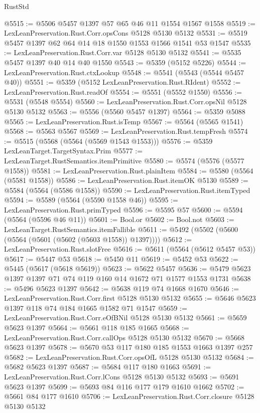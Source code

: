 \begin{lexlean}{RustStd}
\begin{coremodule}
{\begin{coremodule}
{{{{{{{{{{{{{{{{{{{{{{{{{{{{{{{{@5515 := @5506 @5457 @1397 @57 @65 @46 @11 @1554 @1567 @1558
@5519 := LexLeanPreservation.Rust.Corr.opsCons @5128 @5130 @5132
@5531 := @5519 @5457 @1397 @62 @64 @14 @18 @1550 @1553 @1566 @1541 @53 @1547
@5535 := LexLeanPreservation.Rust.Corr.var @5128 @5130 @5132
@5541 := @5535 @5457 @1397 @40 @14 @40 @1550
@5543 := @5359 (@5152 @5226)
@5544 := LexLeanPreservation.Rust.ctxLookup
@5548 := @5541 (@5543 (@5544 @5457 @40))
@5551 := @5359 (@5152 LexLeanPreservation.Rust.RIdent)
@5552 := LexLeanPreservation.Rust.readOf
@5554 := @5551 (@5552 @1550)
@5556 := @5531 (@5548 @5554)
@5560 := LexLeanPreservation.Rust.Corr.opsNil @5128 @5130 @5132
@5563 := @5556 (@5560 @5457 @1397)
@5564 := @5359 @5088
@5565 := LexLeanPreservation.Rust.isTemp
@5567 := @5564 (@5565 @1541)
@5568 := @5563 @5567
@5569 := LexLeanPreservation.Rust.tempFresh
@5574 := @5515 (@5568 (@5564 (@5569 @1543 @1553)))
@5576 := @5359 LexLeanTarget.TargetSyntax.Prim
@5577 := LexLeanTarget.RustSemantics.itemPrimitive
@5580 := @5574 (@5576 (@5577 @1558))
@5581 := LexLeanPreservation.Rust.plainItem
@5584 := @5580 (@5564 (@5581 @1558))
@5586 := LexLeanPreservation.Rust.itemOK @5130
@5589 := @5584 (@5564 (@5586 @1558))
@5590 := LexLeanPreservation.Rust.itemTyped
@5594 := @5589 (@5564 (@5590 @1558 @46))
@5595 := LexLeanPreservation.Rust.primTyped
@5596 := @5595 @57
@5600 := @5594 (@5564 (@5596 @46 @11))
@5601 := Bool.or
@5602 := Bool.not
@5603 := LexLeanTarget.RustSemantics.itemFallible
@5611 := @5492 (@5502 (@5600 (@5564 (@5601 (@5602 (@5603 @1558)) @1397))))
@5612 := LexLeanPreservation.Rust.slotFree
@5616 := @5611 (@5564 (@5612 @5457 @53))
@5617 := @5447 @53
@5618 := @5450 @11
@5619 := @5452 @53
@5622 := @5445 (@5617 (@5618 @5619))
@5623 := @5622 @5457
@5636 := @5479 @5623 @1397 @1397 @71 @74 @119 @160 @14 @1672 @71 @1577 @1553 @1731
@5638 := @5496 @5623 @1397
@5642 := @5638 @119 @74 @1668 @1670
@5646 := LexLeanPreservation.Rust.Corr.first @5128 @5130 @5132
@5655 := @5646 @5623 @1397 @118 @74 @184 @1665 @1582 @71 @1547
@5659 := LexLeanPreservation.Rust.Corr.eOfBNil @5128 @5130 @5132
@5661 := @5659 @5623 @1397
@5664 := @5661 @118 @185 @1665
@5668 := LexLeanPreservation.Rust.Corr.callOps @5128 @5130 @5132
@5670 := @5668 @5623 @1397
@5678 := @5670 @53 @117 @180 @185 @1553 @1663 @1397 @257
@5682 := LexLeanPreservation.Rust.Corr.opsOfL @5128 @5130 @5132
@5684 := @5682 @5623 @1397
@5687 := @5684 @117 @180 @1663
@5691 := LexLeanPreservation.Rust.Corr.lCons @5128 @5130 @5132
@5693 := @5691 @5623 @1397
@5699 := @5693 @84 @116 @177 @179 @1610 @1662
@5702 := @5661 @84 @177 @1610
@5706 := LexLeanPreservation.Rust.Corr.closure @5128 @5130 @5132
}}}}}}}}}}}}}}}}}}}}}}}}}}}}}}}}
\end{coremodule}}
\end{coremodule}
\end{lexlean}

